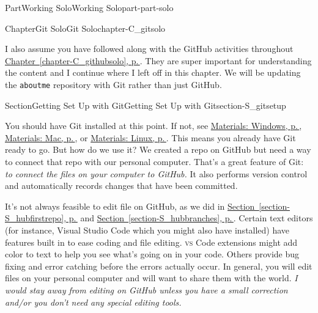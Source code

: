 \documentclass[twoside,10pt,]{book}
\newcommand{\xreffont}{\relax}
\newcommand{\mono}[1]{\texttt{#1}}
\newcommand{\initialism}[1]{\textsc{\MakeLowercase{#1}}}
\begin{document}
\begin{partptx}{Part}{Working Solo}{}{Working Solo}{}{}{part-part-solo}
\begin{chapterptx}{Chapter}{Git Solo}{}{Git Solo}{}{}{chapter-C_gitsolo}
\begin{introduction}{}
\par
I also assume you have followed along with the GitHub activities throughout \hyperref[chapter-C_githubsolo]{Chapter~{\xreffont\ref{chapter-C_githubsolo}}, p.\,\pageref{chapter-C_githubsolo}}. They are super important for understanding the content and I continue where I left off in this chapter. We will be updating the \mono{aboutme} repository with Git rather than just GitHub.%
\end{introduction}%
%
%
\typeout{************************************************}
\typeout{************************************************}
%
\begin{sectionptx}{Section}{Getting Set Up with Git}{}{Getting Set Up with Git}{}{}{section-S_gitsetup}
%
%
\begin{introduction}{}%
You should have Git installed at this point. If not, see \hyperref[preface-materials-windows]{Materials: Windows, p.\,\pageref{preface-materials-windows}}, \hyperref[preface-materials-mac]{Materials: Mac, p.\,\pageref{preface-materials-mac}}, or \hyperref[preface-materials-linux]{Materials: Linux, p.\,\pageref{preface-materials-linux}}. This means you already have Git ready to go. But how do we use it? We created a repo on GitHub but need a way to connect that repo with our personal computer. That's a great feature of Git: \emph{to connect the files on your computer to GitHub.} It also performs version control and automatically records changes that have been committed.%
\par
It's not always feasible to edit file on GitHub, as we did in \hyperref[section-S_hubfirstrepo]{Section~{\xreffont\ref{section-S_hubfirstrepo}}, p.\,\pageref{section-S_hubfirstrepo}} and \hyperref[section-S_hubbranches]{Section~{\xreffont\ref{section-S_hubbranches}}, p.\,\pageref{section-S_hubbranches}}. Certain text editors (for instance, Visual Studio Code which you might also have installed) have features built in to ease coding and file editing. \initialism{VS} Code extensions might add color to text to help you see what's going on in your code. Others provide bug fixing and error catching before the errors actually occur. In general, you will edit files on your personal computer and will want to share them with the world. \emph{I would stay away from editing on GitHub unless you have a small correction and\slash{}or you don't need any special editing tools.}%
\end{introduction}%
%
%
\typeout{************************************************}

\end{sectionptx}
\end{chapterptx}
\end{partptx}
\end{document}

